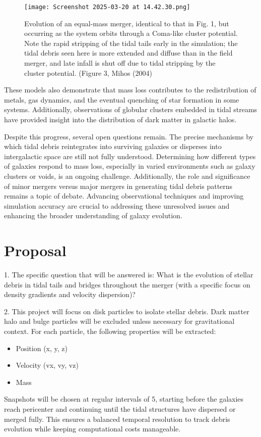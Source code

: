 \documentclass[fleqn,usenatbib]{mnras}
\begin{document}
\begin{figure}
    \centering
    \texttt{[image: Screenshot 2025-03-20 at 14.42.30.png]}
    \caption{Evolution of an equal-mass merger, identical to that in Fig. 1, but occurring as the system orbits through a Coma-like cluster potential. Note the rapid stripping of the tidal tails early in the simulation; the tidal debris seen here is more extended and diﬀuse than in the field merger, and late infall is shut oﬀ due to tidal stripping by the cluster potential. (Figure 3, Mihos (2004)
}
    \label{fig:enter-label}
\end{figure}

These models also demonstrate that mass loss contributes to the redistribution of metals, gas dynamics, and the eventual quenching of star formation in some systems. Additionally, observations of globular clusters embedded in tidal streams have provided insight into the distribution of dark matter in galactic halos.

Despite this progress, several open questions remain. The precise mechanisms by which tidal debris reintegrates into surviving galaxies or disperses into intergalactic space are still not fully understood. Determining how different types of galaxies respond to mass loss, especially in varied environments such as galaxy clusters or voids, is an ongoing challenge. Additionally, the role and significance of minor mergers versus major mergers in generating tidal debris patterns remains a topic of debate. Advancing observational techniques and improving simulation accuracy are crucial to addressing these unresolved issues and enhancing the broader understanding of galaxy evolution.

\section{Proposal}
1. The specific question that will be answered is: What is the evolution of stellar debris in tidal tails and bridges throughout the merger (with a specific focus on density gradients and velocity dispersion)? 

2. This project will focus on disk particles to isolate stellar debris. Dark matter halo and bulge particles will be excluded unless necessary for gravitational context. For each particle, the following properties will be extracted:
    \begin{itemize}
        \item Position (x, y, z)
        \item Velocity (vx, vy, vz)
        \item Mass
    \end{itemize}
Snapshots will be chosen at regular intervals of 5, starting before the galaxies reach pericenter and continuing until the tidal structures have dispersed or merged fully. This ensures a balanced temporal resolution to track debris evolution while keeping computational costs manageable.
\end{document}

